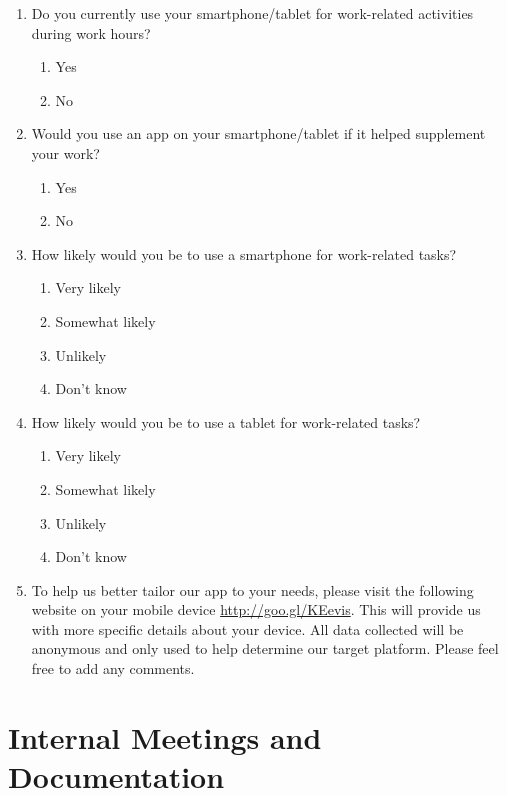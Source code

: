 \documentclass[12pt,a4paper,oneside,titlepage]{article}
\begin{document}
\begin{enumerate}
\item Do you currently use your smartphone/tablet for work-related activities during work hours?
\begin{enumerate}
\item Yes
\item No
\end{enumerate}
\item Would you use an app on your smartphone/tablet if it helped supplement your work?
\begin{enumerate}
\item Yes
\item No
\end{enumerate}
\item How likely would you be to use a smartphone for work-related tasks?
\begin{enumerate}
\item Very likely
\item Somewhat likely
\item Unlikely
\item Don't know
\end{enumerate}
\item How likely would you be to use a tablet for work-related tasks?
\begin{enumerate}
\item Very likely
\item Somewhat likely
\item Unlikely
\item Don't know
\end{enumerate}
\item To help us better tailor our app to your needs, please visit the following website on your mobile device \url{http://goo.gl/KEevis}. This will provide us with more specific details about your device. All data collected will be anonymous and only used to help determine our target platform. Please feel free to add any comments.\\
\framebox[8cm]{}
\end{enumerate}  

\newpage
\section{Internal Meetings and Documentation}
\end{document}
